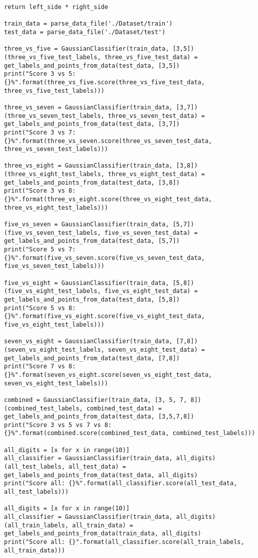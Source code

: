 \begin{lstlisting}[style]
        return left_side * right_side

train_data = parse_data_file('./Dataset/train')
test_data = parse_data_file('./Dataset/test')

three_vs_five = GaussianClassifier(train_data, [3,5])
(three_vs_five_test_labels, three_vs_five_test_data) = get_labels_and_points_from_data(test_data, [3,5])
print("Score 3 vs 5: {}%".format(three_vs_five.score(three_vs_five_test_data, three_vs_five_test_labels)))

three_vs_seven = GaussianClassifier(train_data, [3,7])
(three_vs_seven_test_labels, three_vs_seven_test_data) = get_labels_and_points_from_data(test_data, [3,7])
print("Score 3 vs 7: {}%".format(three_vs_seven.score(three_vs_seven_test_data, three_vs_seven_test_labels)))

three_vs_eight = GaussianClassifier(train_data, [3,8])
(three_vs_eight_test_labels, three_vs_eight_test_data) = get_labels_and_points_from_data(test_data, [3,8])
print("Score 3 vs 8: {}%".format(three_vs_eight.score(three_vs_eight_test_data, three_vs_eight_test_labels)))

five_vs_seven = GaussianClassifier(train_data, [5,7])
(five_vs_seven_test_labels, five_vs_seven_test_data) = get_labels_and_points_from_data(test_data, [5,7])
print("Score 5 vs 7: {}%".format(five_vs_seven.score(five_vs_seven_test_data, five_vs_seven_test_labels)))

five_vs_eight = GaussianClassifier(train_data, [5,8])
(five_vs_eight_test_labels, five_vs_eight_test_data) = get_labels_and_points_from_data(test_data, [5,8])
print("Score 5 vs 8: {}%".format(five_vs_eight.score(five_vs_eight_test_data, five_vs_eight_test_labels)))

seven_vs_eight = GaussianClassifier(train_data, [7,8])
(seven_vs_eight_test_labels, seven_vs_eight_test_data) = get_labels_and_points_from_data(test_data, [7,8])
print("Score 7 vs 8: {}%".format(seven_vs_eight.score(seven_vs_eight_test_data, seven_vs_eight_test_labels)))

combined = GaussianClassifier(train_data, [3, 5, 7, 8])
(combined_test_labels, combined_test_data) = get_labels_and_points_from_data(test_data, [3,5,7,8])
print("Score 3 vs 5 vs 7 vs 8: {}%".format(combined.score(combined_test_data, combined_test_labels)))

all_digits = [x for x in range(10)]
all_classifier = GaussianClassifier(train_data, all_digits)
(all_test_labels, all_test_data) = get_labels_and_points_from_data(test_data, all_digits)
print("Score all: {}%".format(all_classifier.score(all_test_data, all_test_labels)))

all_digits = [x for x in range(10)]
all_classifier = GaussianClassifier(train_data, all_digits)
(all_train_labels, all_train_data) = get_labels_and_points_from_data(train_data, all_digits)
print("Score all: {}".format(all_classifier.score(all_train_labels, all_train_data)))

\end{lstlisting}

